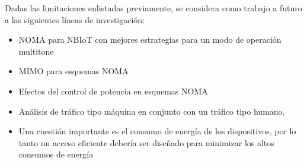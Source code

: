 Dadas las limitaciones enlistadas previamente, se considera como trabajo a futuro a las siguientes líneas de investigación:
\begin{itemize}
    \item NOMA para NBIoT con mejores estrategias para un modo de operación multitone
    \item MIMO para esquemas NOMA
    \item Efectos del control de potencia en esquemas NOMA
    \item Análisis de tráfico tipo máquina en conjunto con un tráfico tipo humano.
    \item Una cuestión importante es el consumo de energía de los dispositivos, por lo tanto un acceso eficiente debería ser diseñado para minimizar los altos consumos de energía
\end{itemize}


